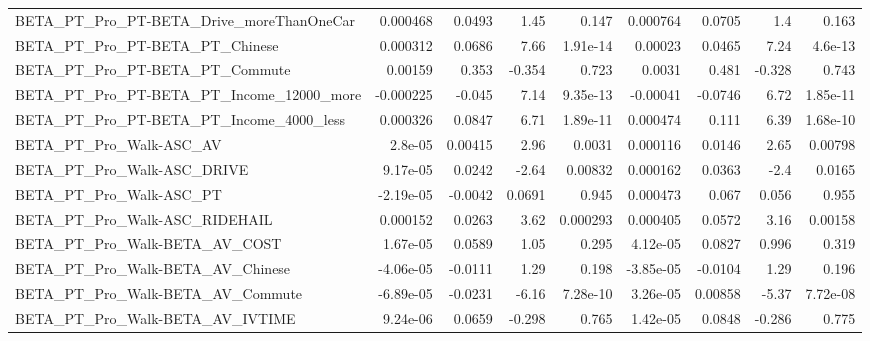 \begin{tabular}{lrrrrrrrr}
BETA\_PT\_Pro\_PT-BETA\_Drive\_moreThanOneCar           &    0.000468 &       0.0493 &      1.45 &    0.147 &   0.000764 &      0.0705 &          1.4 &         0.163 \\
BETA\_PT\_Pro\_PT-BETA\_PT\_Chinese                     &    0.000312 &       0.0686 &      7.66 & 1.91e-14 &    0.00023 &      0.0465 &         7.24 &       4.6e-13 \\
BETA\_PT\_Pro\_PT-BETA\_PT\_Commute                     &     0.00159 &        0.353 &    -0.354 &    0.723 &     0.0031 &       0.481 &       -0.328 &         0.743 \\
BETA\_PT\_Pro\_PT-BETA\_PT\_Income\_12000\_more           &   -0.000225 &       -0.045 &      7.14 & 9.35e-13 &   -0.00041 &     -0.0746 &         6.72 &      1.85e-11 \\
BETA\_PT\_Pro\_PT-BETA\_PT\_Income\_4000\_less            &    0.000326 &       0.0847 &      6.71 & 1.89e-11 &   0.000474 &       0.111 &         6.39 &      1.68e-10 \\
BETA\_PT\_Pro\_Walk-ASC\_AV                            &     2.8e-05 &      0.00415 &      2.96 &   0.0031 &   0.000116 &      0.0146 &         2.65 &       0.00798 \\
BETA\_PT\_Pro\_Walk-ASC\_DRIVE                         &    9.17e-05 &       0.0242 &     -2.64 &  0.00832 &   0.000162 &      0.0363 &         -2.4 &        0.0165 \\
BETA\_PT\_Pro\_Walk-ASC\_PT                            &   -2.19e-05 &      -0.0042 &    0.0691 &    0.945 &   0.000473 &       0.067 &        0.056 &         0.955 \\
BETA\_PT\_Pro\_Walk-ASC\_RIDEHAIL                      &    0.000152 &       0.0263 &      3.62 & 0.000293 &   0.000405 &      0.0572 &         3.16 &       0.00158 \\
BETA\_PT\_Pro\_Walk-BETA\_AV\_COST                      &    1.67e-05 &       0.0589 &      1.05 &    0.295 &   4.12e-05 &      0.0827 &        0.996 &         0.319 \\
BETA\_PT\_Pro\_Walk-BETA\_AV\_Chinese                   &   -4.06e-05 &      -0.0111 &      1.29 &    0.198 &  -3.85e-05 &     -0.0104 &         1.29 &         0.196 \\
BETA\_PT\_Pro\_Walk-BETA\_AV\_Commute                   &   -6.89e-05 &      -0.0231 &     -6.16 & 7.28e-10 &   3.26e-05 &     0.00858 &        -5.37 &      7.72e-08 \\
BETA\_PT\_Pro\_Walk-BETA\_AV\_IVTIME                    &    9.24e-06 &       0.0659 &    -0.298 &    0.765 &   1.42e-05 &      0.0848 &       -0.286 &         0.775 \\

\end{tabular}
